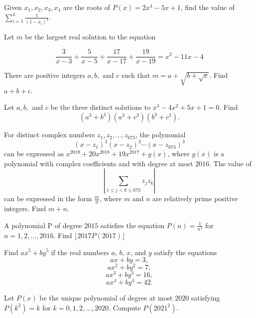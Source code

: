 \documentclass[mast]{lucky}
\begin{document}
\begin{prob}{6}

Given $x_1,x_2,x_3,x_4$ are the roots of $P(x)=2x^4-5x+1$, find the value of $\sum_{i=1}^4 \frac{1}{(1-x_i)^3}$.
\end{prob}

\begin{prob}[AIME I 2014/14]{6}

Let $m$ be the largest real solution to the equation

$$ \dfrac{3}{x-3} + \dfrac{5}{x-5} + \dfrac{17}{x-17} + \dfrac{19}{x-19} = x^2 - 11x - 4$$

There are positive integers $a, b,$ and $c$ such that $m = a + \sqrt{b + \sqrt{c}}$. Find $a+b+c$.
\end{prob}

\begin{prob}{6}
Let $a, b,$ and $c$ be the three distinct solutions to $x^{3} - 4x^{2} + 5x + 1 = 0$.
Find $$(a^3+b^3)(a^3+c^3)(b^3+c^3).$$
\end{prob}

\begin{prob}[AIME I 2019/10]{6}
For distinct complex numbers $z_1,z_2,\dots,z_{673}$, the polynomial\[(x-z_1)^3(x-z_2)^3 \cdots (x-z_{673})^3\]can be expressed as $x^{2019} + 20x^{2018} + 19x^{2017}+g(x)$, where $g(x)$ is a polynomial with complex coefficients and with degree at most $2016$. The value of\[\left| \sum_{1 \le j <k \le 673} z_jz_k \right|\]can be expressed in the form $\tfrac{m}{n}$, where $m$ and $n$ are relatively prime positive integers. Find $m+n$.
\end{prob}

\begin{prob}{9}
A polynomial P of degree $2015$ satisfies the equation $P(n) = \frac{1}{n^2}$ for $n = 1, 2, \ldots , 2016$. Find
$\lfloor 2017P(2017) \rfloor$
\end{prob}

\begin{prob}[AIME 1990/15]{9}
Find $ax^5 + by^5$ if the real numbers $a$, $b$, $x$, and $y$ satisfy the equations\[ax + by = 3,\]\[ax^2 + by^2 = 7,\]\[ax^3 + by^3 = 16,\]\[ax^4 + by^4 = 42.\]
\end{prob}


\begin{prob}{13}
Let $P(x)$ be the unique polynomial of degree at most $2020$ satisfying $P(k^2) = k$ for $k = 0, 1, 2, \ldots , 2020$.
Compute $P(2021^2)$.
\end{prob}
\end{document}
